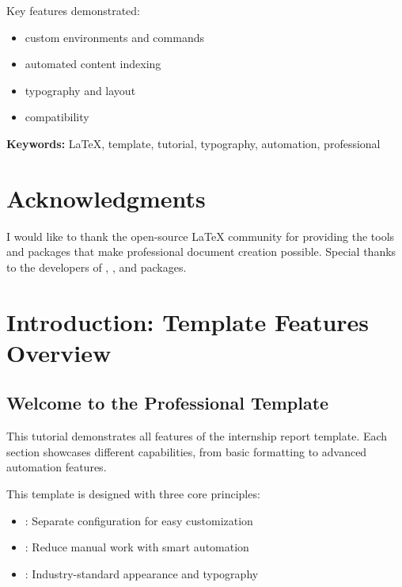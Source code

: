 \documentclass{internshipreport}
\begin{document}
\begin{results}
Key features demonstrated:
\begin{itemize}
\item {} custom environments and commands
\item {} automated content indexing
\item {} typography and layout
\item {} compatibility
\end{itemize}
\end{results}

\textbf{Keywords:} LaTeX, template, tutorial, typography, automation, professional

\chapter*{Acknowledgments}

I would like to thank the open-source LaTeX community for providing the tools and packages that make professional document creation possible. Special thanks to the developers of , , and  packages.


\mainmatter

\chapter{Introduction: Template Features Overview}
\label{chap:introduction}

\section{Welcome to the Professional Template}

This tutorial demonstrates all features of the internship report template. Each section showcases different capabilities, from basic formatting to advanced automation features.

\begin{infobox}
This template is designed with three core principles:
\begin{itemize}
\item {}: Separate configuration for easy customization
\item {}: Reduce manual work with smart automation
\item {}: Industry-standard appearance and typography
\end{itemize}
\end{infobox}
\end{document}

